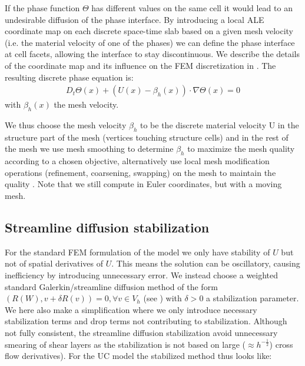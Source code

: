 If the phase function $\Theta$ has different values on the same cell
it would lead to an undesirable diffusion of the phase interface. By
introducing a local ALE coordinate map \cite{ErikssonEstepEtAl1996} on
each discrete space-time slab based on a given mesh velocity (i.e. the
material velocity of one of the phases) we can define the phase
interface at cell facets, allowing the interface to stay
discontinuous. We describe the details of the coordinate map and its
influence on the FEM discretization
in \cite{HoffmanJanssonEtAl2009}. The resulting discrete phase
equation is:
\begin{equation}
\begin{split}\label{eq:ALE}
D_t \Theta(x) +
(U(x) - \beta_h(x)) \cdot \nabla \Theta(x) = 0
\end{split}
\end{equation}
with $\beta_h(x)$ the mesh velocity.

We thus choose the mesh velocity $\beta_h$ to be the discrete material
velocity U in the structure part of the mesh (vertices touching
structure cells) and in the rest of the mesh we use mesh smoothing to
determine $\beta_h$ to maximize the mesh quality according to a chosen
objective, alternatively use local mesh modification operations
(refinement, coarsening, swapping) on the mesh to maintain the quality
\cite{CompereHoffmanEtAl2009}. Note that we still compute in Euler
coordinates, but with a moving mesh.

\subsection{Streamline diffusion stabilization}

For the standard FEM formulation of the model we only have stability
of $U$ but not of spatial derivatives of $U$. This means the solution
can be oscillatory, causing inefficiency by introducing unnecessary
error. We instead choose a weighted standard Galerkin/streamline
diffusion method of the form $(R(W), v + \delta R(v)) = 0, \forall v
\in V_h$ (see \cite{ErikssonEstepEtAl1996}) with $\delta > 0$ a stabilization
parameter. We here also make a simplification where we only introduce
necessary stabilization terms and drop terms not contributing to
stabilization. Although not fully consistent, the streamline diffusion
stabilization avoid unnecessary smearing of shear layers as the
stabilization is not based on large ($\approx h^{-\frac{1}{2}}$) cross flow
derivatives). For the UC model the stabilized method thus looks like:

